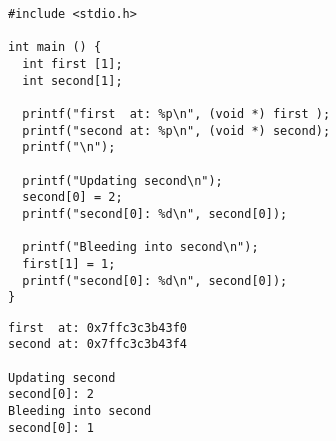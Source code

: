 \begin{frame}[fragile]
%
%
\begin{warnbox}[Speicherverletzung, leftupper=6mm]
\begin{verbatim}
#include <stdio.h>

int main () {
  int first [1];
  int second[1];
  
  printf("first  at: %p\n", (void *) first );
  printf("second at: %p\n", (void *) second);
  printf("\n");
  
  printf("Updating second\n");
  second[0] = 2;
  printf("second[0]: %d\n", second[0]);

  printf("Bleeding into second\n");
  first[1] = 1;  
  printf("second[0]: %d\n", second[0]);
}
\end{verbatim}
\end{warnbox}%
%
%
\begin{cmdbox}[Ausgabe]
\begin{verbatim}
first  at: 0x7ffc3c3b43f0
second at: 0x7ffc3c3b43f4

Updating second
second[0]: 2
Bleeding into second
second[0]: 1
\end{verbatim}
\end{cmdbox}
%
\end{frame}


